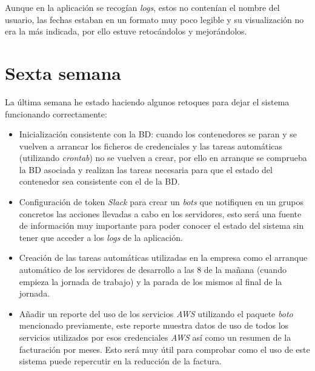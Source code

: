 Aunque en la aplicación se recogían \textit{logs}, estos no contenían el nombre del usuario, las fechas estaban en un formato muy poco legible y su visualización no era la más indicada, por ello estuve retocándolos y mejorándolos.

\section{Sexta semana}
La última semana he estado haciendo algunos retoques para dejar el sistema funcionando correctamente:

\begin{itemize}
	\item Inicialización consistente con la BD: cuando los contenedores se paran y se vuelven a arrancar los ficheros de credenciales y las tareas automáticas (utilizando \textit{crontab}) no se vuelven a crear, por ello en arranque se comprueba la BD asociada y realizan las tareas necesaria para que el estado del contenedor sea consistente con el de la BD.
	
	\item Configuración de token \textit{Slack} para crear un \textit{bots} que notifiquen en un grupos concretos las acciones llevadas a cabo en los servidores, esto será una fuente de información muy importante para poder conocer el estado del sistema sin tener que acceder a los \textit{logs} de la aplicación.
	
	\item Creación de las tareas automáticas utilizadas en la empresa como el arranque automático de los servidores de desarrollo a las 8 de la mañana (cuando empieza la jornada de trabajo) y la parada de los mismos al final de la jornada.
	
	\item Añadir un reporte del uso de los servicios \textit{AWS} utilizando el paquete \textit{boto} mencionado previamente, este reporte muestra datos de uso de todos los servicios utilizados por esos credenciales \textit{AWS} así como un resumen de la facturación por meses. Esto será muy útil para comprobar como el uso de este sistema puede repercutir en la reducción de la factura.
\end{itemize}



